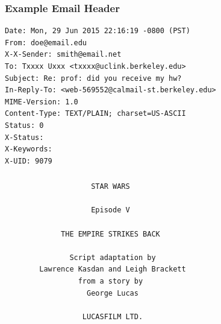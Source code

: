 \documentclass[12pt]{beamer}\usepackage[]{graphicx}\usepackage[]{color}
\begin{document}

\begin{frame}[fragile]
\frametitle{Example Email Header}

\begin{verbatim}
Date: Mon, 29 Jun 2015 22:16:19 -0800 (PST)
From: doe@email.edu
X-X-Sender: smith@email.net
To: Txxxx Uxxx <txxxx@uclink.berkeley.edu>
Subject: Re: prof: did you receive my hw?
In-Reply-To: <web-569552@calmail-st.berkeley.edu>
MIME-Version: 1.0
Content-Type: TEXT/PLAIN; charset=US-ASCII
Status: 0
X-Status: 
X-Keywords:
X-UID: 9079
\end{verbatim}

\end{frame}


\begin{frame}
\begin{center}
\Huge{}
\end{center}
\end{frame}


\begin{frame}
\frametitle{}
\begin{center}
\end{center}
\end{frame}


\begin{frame}
\frametitle{}
\begin{center}
\end{center}
\end{frame}


\begin{frame}[fragile]
\frametitle{}

\begin{verbatim}
                    STAR WARS

                    Episode V
                                   
             THE EMPIRE STRIKES BACK

               Script adaptation by
        Lawrence Kasdan and Leigh Brackett
                 from a story by
                   George Lucas

                  LUCASFILM LTD.
\end{verbatim}

\end{frame}
\end{document}
